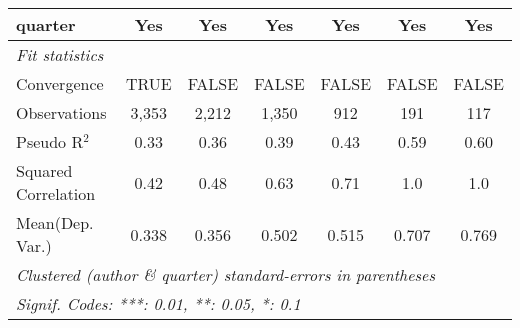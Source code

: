 \begin{tabular}{lcccccc}
   quarter                                                    & Yes           & Yes     & Yes           & Yes           & Yes             & Yes\\  
   \midrule
   \emph{Fit statistics}\\
   Convergence                                                &TRUE           & FALSE   & FALSE         & FALSE         & FALSE           & FALSE\\  
   Observations                                               & 3,353         & 2,212   & 1,350         & 912           & 191             & 117\\  
   Pseudo R$^2$                                               & 0.33          & 0.36    & 0.39          & 0.43          & 0.59            & 0.60\\  
   Squared Correlation                                        & 0.42          & 0.48    & 0.63          & 0.71          & 1.0             & 1.0\\  
Mean(Dep. Var.) & 0.338 & 0.356 & 0.502 & 0.515 & 0.707 & 0.769 \\
   \midrule \midrule
   \multicolumn{7}{l}{\emph{Clustered (author \& quarter) standard-errors in parentheses}}\\
   \multicolumn{7}{l}{\emph{Signif. Codes: ***: 0.01, **: 0.05, *: 0.1}}\\
\end{tabular}
\par\endgroup
